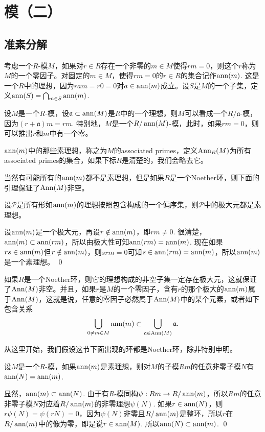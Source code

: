 \renewcommand\chapterimg{../Pictures/5.png}

\chapter{模（二）}

\section{准素分解}

\para 考虑一个$R$-模$M$，如果对$r\in R$存在一个非零的$m\in M$使得$rm=0$，则这个$r$称为$M$的一个零因子。对固定的$m\in M$，使得$rm=0$的$r\in R$的集合记作$\operatorname{ann}(m)$. 这是一个$R$中的理想，因为$ram=r0=0$对$a\in \operatorname{ann}(m)$成立。设$S$是$M$的一个子集，定义$\operatorname{ann}(S)=\bigcap_{m\in S}\operatorname{ann}(m)$.

设$M$是一个$R$-模，设$\mathfrak{a}\subset \operatorname{ann}(M)$是$R$中的一个理想，则$M$可以看成一个$R/\mathfrak{a}$-模，因为$(r+\mathfrak{a})m=rm$. 特别地，$M$是一个$R/\operatorname{ann}(M)$-模，此时，如果$rm=0$，则可以推出$r$和$m$中有一个零。

\para $\operatorname{ann}(m)$中的那些素理想，称之为$M$的associated primes，定义$\operatorname{Ann}_R(M)$为所有associated primes的集合，如果下标$R$是清楚的，我们会略去它。

当然有可能所有的$\operatorname{ann}(m)$都不是素理想，但是如果$R$是一个Noether环，则下面的引理保证了$\operatorname{Ann}(M)$非空。

\lem 设$\mathcal{P}$是所有形如$\operatorname{ann}(m)$的理想按照包含构成的一个偏序集，则$\mathcal{P}$中的极大元都是素理想。

\proof
	设$\operatorname{ann}(m)$是一个极大元，再设$r\notin \operatorname{ann}(m)$，即$rm\neq 0$. 很清楚，$\operatorname{ann}(m)\subset \operatorname{ann}(rm)$，所以由极大性可知$\operatorname{ann}(rm)=\operatorname{ann}(m)$. 现在如果$rs\in \operatorname{ann}(m)$但$r\notin \operatorname{ann}(m)$，则$srm=0$可知$s\in \operatorname{ann}(rm)=\operatorname{ann}(m)$，所以$\operatorname{ann}(m)$是一个素理想。
\qed

如果$R$是一个Noether环，则它的理想构成的非空子集一定存在极大元，这就保证了$\operatorname{Ann}(M)$非空。并且，如果$r$是$M$的一个零因子，含有$r$的那个极大的$\operatorname{ann}(m)$属于$\operatorname{Ann}(M)$，这就是说，任意的零因子必然属于$\operatorname{Ann}(M)$中的某个元素，或者如下包含关系
\[
	\bigcup_{0\neq m\in M}\operatorname{ann}(m)\subset \bigcup_{\mathfrak{a}\in \operatorname{Ann}(M)}\mathfrak{a}. 
\]

从这里开始，我们假设这节下面出现的环都是Noether环，除非特别申明。

\lem 设$M$是一个$R$-模，如果$\operatorname{ann}(m)$是素理想，则对$M$的子模$Rm$的任意非零子模$N$有$\operatorname{ann}(N)=\operatorname{ann}(m)$.

\proof
	显然，$\operatorname{ann}(m)\subset \operatorname{ann}(N)$. 由于有$R$-模同构$\psi: Rm\to R/\operatorname{ann}(m)$，所以$Rm$的任意非零子模$N$对应着$R/\operatorname{ann}(m)$的非零理想$\psi(N)$. 如果$r\in \operatorname{ann}(N)$，则$r\psi(N)=\psi(rN)=0$，因为$\psi(N)$非零且$R/\operatorname{ann}(m)$是整环，所以$r$在$R/\operatorname{ann}(m)$中的像为零，即是说$r\in \operatorname{ann}(M)$. 所以$\operatorname{ann}(N)\subset \operatorname{ann}(m)$.
\qed

